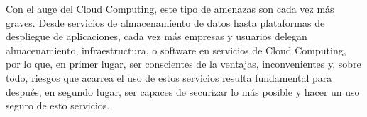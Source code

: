 Con el auge del Cloud Computing, este tipo de amenazas son cada vez más graves. Desde servicios de almacenamiento de datos hasta plataformas de despliegue de aplicaciones, cada vez más empresas y usuarios delegan almacenamiento, infraestructura, o software en servicios de Cloud Computing, por lo que, en primer lugar, ser conscientes de la ventajas, inconvenientes y, sobre todo, riesgos que acarrea el uso de estos servicios resulta fundamental para después, en segundo lugar, ser capaces de securizar lo más posible y hacer un uso seguro de esto servicios.


